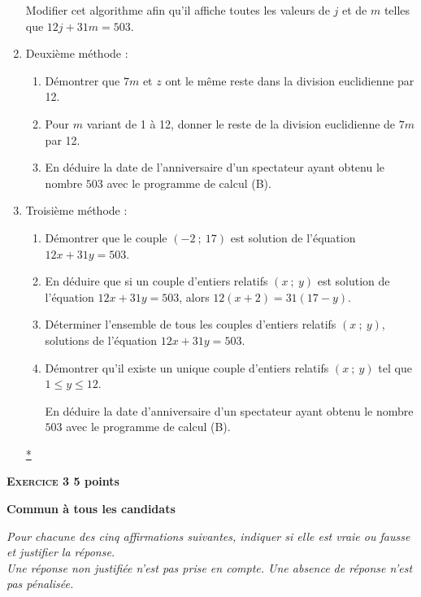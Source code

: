 \documentclass[10pt]{article}
\begin{document}
\begin{enumerate}
Modifier cet algorithme afin qu'il affiche toutes les valeurs de $j$ et de $m$ telles que $12j + 31m = 503$. 
\item Deuxième méthode :
	\begin{enumerate}
		\item Démontrer que $7m$ et $z$ ont le même reste dans la division euclidienne par 12. 
		\item Pour $m$ variant de 1 à 12, donner le reste de la division euclidienne de $7m$ par 12. 
		\item En déduire la date de l'anniversaire d'un spectateur ayant obtenu le nombre $503$ avec le programme de calcul (B).
	\end{enumerate} 
\item Troisième méthode : 
	\begin{enumerate}
		\item Démontrer que le couple $(-2~;~17)$ est solution de l'équation $12x + 31y = 503$. 
		\item En déduire que si un couple d'entiers relatifs $(x~;~y)$ est solution de l'équation $12x + 31y = 503$, alors $12(x + 2) = 31 (17 - y)$. 
		\item Déterminer l'ensemble de tous les couples d'entiers relatifs 
		$(x~;~y)$, solutions de l'équation $12x + 31y = 503$. 
		\item Démontrer qu'il existe un unique couple d'entiers relatifs $(x~;~y)$ tel que $1 \leqslant y \leqslant 12$.
		 
En déduire la date d'anniversaire d'un spectateur ayant obtenu le nombre $503$ avec le programme de calcul (B).
	\end{enumerate}
\hyperlink{Index}{*}	 
\end{enumerate} 

\vspace{0,5cm}

\textbf{\textsc{Exercice 3} \hfill 5 points}
 
\textbf{Commun  à tous les candidats}

\medskip

\emph{Pour chacune des cinq affirmations suivantes, indiquer si elle est vraie ou fausse et justifier la réponse. \\
Une réponse non justifiée n'est pas prise en compte. Une absence de réponse n'est pas pénalisée.}

\medskip
 
\end{document}
